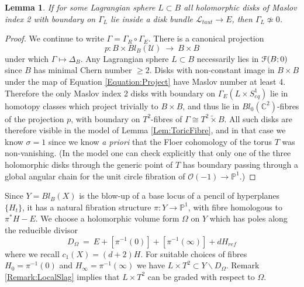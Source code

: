 \documentclass[reqno,10pt]{amsart}
\numberwithin{equation}{section}
\newcommand{\bC}{{\mathbb C}}
\newcommand{\bP}{{\mathbb P}}
\newcommand{\scrF}{\EuScript{F}}
\newtheorem{Lemma}[thm]{Lemma}
\theoremstyle{remark}
\begin{document}
\begin{Lemma} \label{Lem:DisksLocalise}
If for some Lagrangian sphere $L\subset B$ all holomorphic disks of Maslov index 2 with boundary on $\Gamma_L$ lie inside a disk bundle $\mathcal{L}_{taut} \rightarrow E$, then $\Gamma_L \not \simeq 0$.
\end{Lemma}

\begin{proof}
We continue to write $\Gamma = \Gamma_R\circ \Gamma_E$.
  There is a canonical projection
\begin{equation} \label{Equation:Project}
p: B \times Bl_B(\mathcal{U}) \ \longrightarrow \ B\times B
\end{equation}
under which $\Gamma \mapsto \Delta_B$. Any Lagrangian sphere $L\subset B$ necessarily lies in $\scrF(B;0)$ since $B$ has minimal Chern number $\geq 2$. Disks with non-constant image in $B \times B$ under the map of Equation \ref{Equation:Project} have Maslov number at least 4. Therefore the only Maslov index 2 disks with boundary on $\Gamma_E(L\times S^1_{eq})$ lie in homotopy classes which project trivially to $B\times B$, and thus lie in $Bl_0(\bC^2)$-fibres of the projection $p$, with boundary on $T^2$-fibres of $\Gamma \cong T^2\tilde{\times} B$. All such disks are therefore visible in the model of Lemma \ref{Lem:ToricFibre}, and in that case we know $\sigma = 1$ since we know \emph{a priori} that the Floer cohomology of the torus $T$ was non-vanishing.   (In the model one can check explicitly that only one of the three holomorphic disks through the generic point of $T$ has boundary passing through a global angular chain for the unit circle fibration of $\mathcal{O}(-1) \rightarrow \bP^1$.) 
\end{proof}

Since $Y = Bl_B(X)$ is the blow-up of a base locus of a pencil of hyperplanes $\{H_t\}$, it has a natural fibration structure $\pi: Y\rightarrow \bP^1$, with fibre homologous to $\pi^*H - E$.  
 We choose a holomorphic volume form $\Omega$ on $Y$ which has poles along the reducible divisor
\begin{equation} \label{Equation:HolVolForm}
D_{\Omega} \ = \ E + [\pi^{-1}(0)] + [\pi^{-1}(\infty)] + d H_{ref}
\end{equation}
where we recall $c_1(X) = (d+2)H$. For suitable choices of fibres $H_0 = \pi^{-1}(0)$ and $H_{\infty} = \pi^{-1}(\infty)$ we have $L\times T^2 \subset Y\backslash D_{\Omega}$.  Remark \ref{Remark:LocalSlag} implies that $L\times T^2$ can be graded with respect to $\Omega$. 
\end{document}
